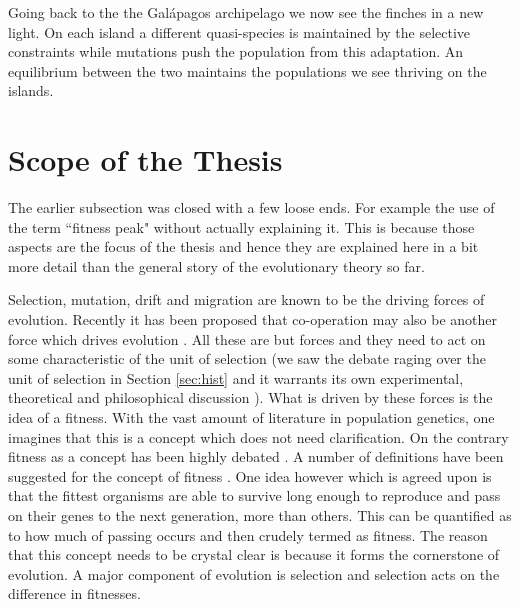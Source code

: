 \documentclass[oneside,11pt,a4paper]{book}
\begin{document}
Going back to the the Gal\'apagos archipelago we now see the finches in a new light.
On each island a different quasi-species is maintained by the selective constraints while mutations push the population from this adaptation.
An equilibrium between the two maintains the populations we see thriving on the islands.

\section{Scope of the Thesis}
The earlier subsection was closed with a few loose ends.
For example the use of the term ``fitness peak" without actually explaining it.
This is because those aspects are the focus of the thesis and hence they are explained here in a bit more detail than the general story of the evolutionary theory so far.

Selection, mutation, drift and migration are known to be the driving forces of evolution.
Recently it has been proposed that co-operation may also be another force which drives evolution \citep{nowak:2008wa}.
All these are but forces and they need to act on some characteristic of the unit of selection
(we saw the debate raging over the unit of selection in Section \ref{sec:hist} and it warrants its own experimental, theoretical and philosophical discussion \citep{okasha:2006aa}).
What is driven by these forces is the idea of a fitness.
With the vast amount of literature in population genetics, one imagines that this is a concept which does not need clarification.
On the contrary fitness as a concept has been highly debated \citep{haldane:1932bo,cartwright:2000bo,orr:2009aa}.
A number of definitions have been suggested for the concept of fitness \citep{ariew:2004fi,werf:2009bo}.
One idea however which is agreed upon is that the fittest organisms are able to survive long enough to reproduce and pass on their genes to the next generation, more than others.
This can be quantified as to how much of passing occurs and then crudely termed as fitness.
The reason that this concept needs to be crystal clear is because it forms the cornerstone of evolution.
A major component of evolution is selection and selection acts on the difference in fitnesses.
\end{document}
